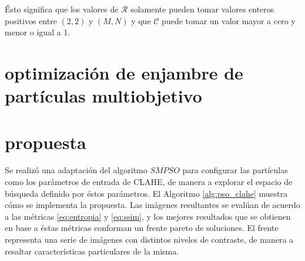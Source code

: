 \documentclass[spanish,twocolumn]{article}
\begin{document}
Ésto significa que los valores de $\mathcal{R}$ solamente pueden tomar valores enteros positivos entre $(2,2)$ y $(M,N)$ y que $\mathscr{C}$ puede tomar un valor mayor a cero y menor o igual a 1.

\section{optimización de enjambre de partículas multiobjetivo}
\label{sec:mspso}



\section{propuesta}
\label{sec:propuesta}

Se realizó una adaptación del algoritmo $SMPSO$ para configurar las partículas como los parámetros de entrada de CLAHE, de manera a explorar el espacio de búsqueda definido por éstos parámetros. El Algoritmo \eqref{alg:pso_clahe} muestra cómo se implementa la propuesta. Las imágenes resultantes se evalúan de acuerdo a las métricas \eqref{eq:entropia} y \eqref{eq:ssim}, y los mejores resultados que se obtienen en base a éstas métricas conforman un frente pareto de soluciones. El frente representa una serie de imágenes con distintos niveles de contraste, de manera a resaltar características particulares de la misma.
\end{document}
